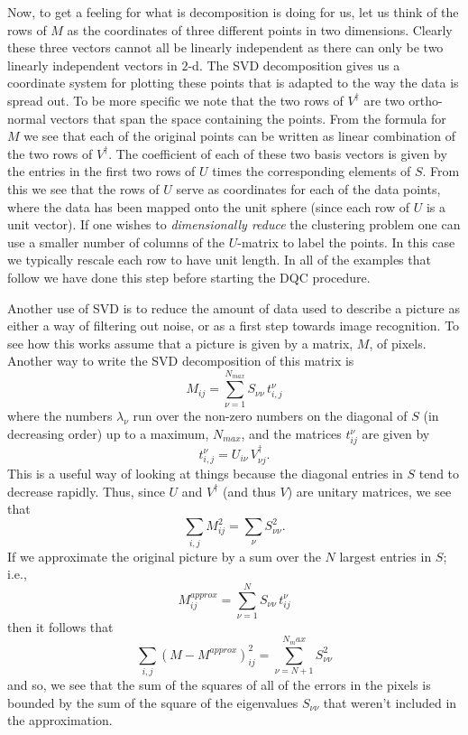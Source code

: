 \documentclass[fleqn,twoside]{article}
\def\be{\begin{equation}}
\def\ee{\end{equation}}
\begin{document}
Now, to get a feeling for what is decomposition is doing for us, let
us think of the rows of $M$ as the coordinates of three different points in two
dimensions.  Clearly these three vectors cannot all be linearly independent as
there can only be two linearly independent vectors in $2$-d.
The SVD decomposition gives us a coordinate system for plotting these
points that is adapted to the way the data is spread out.  To be
more specific we note that the two rows of $V^\dag$ are two ortho-normal vectors
that span the space containing the points.  From the formula for $M$ we
see that each of the original points can be written as linear combination
of the two rows of $V^{\dag}$.  The coefficient of each of these two basis
vectors is given by the entries in the first two rows of $U$ times the
corresponding elements of $S$.  From this we see that the rows of $U$ serve
as coordinates for each of the data points, where the data has been mapped
onto the unit sphere (since each row of $U$ is a unit vector).
If one wishes to {\it dimensionally reduce\/} the clustering problem
one can use a smaller number of columns of the $U$-matrix to label the
points.  In this case we typically rescale each row to have unit length.
In all of the examples that follow we have done this step before starting
the DQC procedure.

Another use of SVD is to reduce the amount of data used to describe a picture
as either a way of filtering out noise, or as a first step towards image
recognition.  To see how this works assume that a picture is given by
a matrix, $M$, of pixels.  Another way to write the SVD decomposition of
this matrix is
\be
    M_{ij} = \sum_{\nu = 1}^{N_{max}} S_{\nu \nu}\, t^{\nu}_{i,j}
\ee
where the numbers $\lambda_{\nu}$ run over the non-zero numbers on the
diagonal of $S$ (in decreasing order) up to a maximum, $N_{max}$,
and the matrices $t^{\nu}_{ij}$ are given by
\be
    t^{\nu}_{i,j} = U_{i \nu}\, V^{\dag}_{\nu j}.
\ee
This is a useful way of looking at things because the
diagonal entries in $S$ tend to decrease rapidly.  Thus,
since $U$ and $V^{\dag}$ (and thus $V$) are unitary matrices, we see
that
\be
    \sum_{i,j} M^2_{ij} = \sum_{\nu} S_{\nu \nu}^2 .
\ee
If we approximate the original picture by a sum over the $N$
largest entries in $S$; i.e.,
\be
    M^{approx}_{ij} = \sum_{\nu = 1}^{N} S_{\nu \nu}\,t^{\nu}_{ij}
\ee
then it follows that
\be
   \sum_{i,j}(M - M^{approx})^2_{ij} = \sum_{\nu = N+1}^{N_max} S_{\nu \nu}^2
\ee
and so, we see that the sum of the squares of all of the errors in the
pixels is bounded by the sum of the square of the eigenvalues $S_{\nu \nu}$
that weren't included in the approximation.
\end{document}
